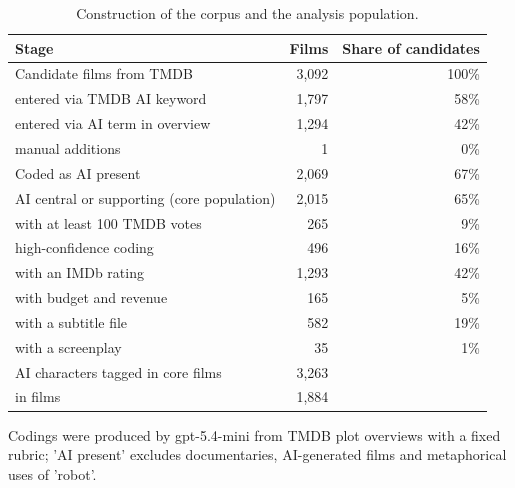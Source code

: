 \begin{table}[htbp]
\centering
\caption{Construction of the corpus and the analysis population.}
\label{tab:corpus}
\begin{tabular}{lrr}
\toprule
Stage & Films & Share of candidates \\
\midrule
Candidate films from TMDB & 3,092 & 100\% \\
  entered via TMDB AI keyword & 1,797 & 58\% \\
  entered via AI term in overview & 1,294 & 42\% \\
  manual additions & 1 & 0\% \\
Coded as AI present & 2,069 & 67\% \\
AI central or supporting (core population) & 2,015 & 65\% \\
  with at least 100 TMDB votes & 265 & 9\% \\
  high-confidence coding & 496 & 16\% \\
  with an IMDb rating & 1,293 & 42\% \\
  with budget and revenue & 165 & 5\% \\
  with a subtitle file & 582 & 19\% \\
  with a screenplay & 35 & 1\% \\
AI characters tagged in core films & 3,263 &  \\
  in films & 1,884 &  \\
\bottomrule
\end{tabular}
\par\smallskip\footnotesize Codings were produced by gpt-5.4-mini from TMDB plot overviews with a fixed rubric; 'AI present' excludes documentaries, AI-generated films and metaphorical uses of 'robot'.
\end{table}
